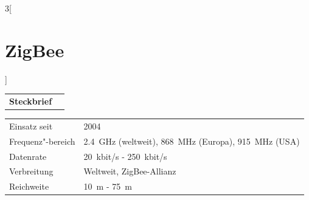 \begin{multicols}{3}[\section{ZigBee}]


\newrefsegment

\begin{boxedminipage}{\linewidth}
\begin{tabular}{p{}p{2.7 cm}}
\textbf{Steckbrief}& \\
\end{tabular}
\begin{tabular}{p{}p{2.7 cm}}
      Einsatz seit & 2004\\
      Frequenz"-bereich  & \SI{2,4}{\giga\hertz} (weltweit), \SI{868}{\mega\hertz} (Europa), \SI{915}{\mega\hertz} (USA)  \\				
      Datenrate & \SI{20}{kbit/s} - \SI{250}{kbit/s}\\
      Verbreitung & Weltweit, ZigBee-Allianz\\
      Reichweite & \SI{10}{\metre} - \SI{75}{\metre}\\
\end{tabular}
\end{boxedminipage}
\par


\end{multicols}
